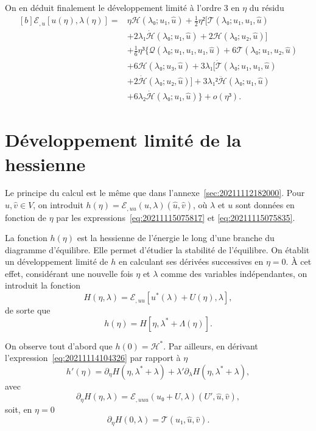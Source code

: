 \documentclass[12pt, final]{amsart}
\begin{document}
On en déduit finalement le développement limité à l'ordre 3 en \(η\) du résidu
\begin{equation}
  \label{eq:20220107080901}
  \begin{aligned}[b]
    ℰ_{,u}[u(η), λ(η)]={}
    &ηℋ(λ₀; u₁, \hat{u})
    +\tfrac12η²\bigl[𝒯(λ₀; u₁, u₁, \hat{u})\\
    &+2λ₁\dot{ℋ}(λ₀; u₁, \hat{u})
    +2ℋ(λ₀; u₂, \hat{u})\bigr]\\
    &+\tfrac16η³\bigl\{
    𝒬(λ₀; u₁, u₁, u₁, \hat{u})
    +6𝒯(λ₀; u₁, u₂, \hat{u})\\
    &+6ℋ(λ₀; u₃, \hat{u})
    +3λ₁\bigl[\dot{𝒯}(λ₀; u₁, u₁, \hat{u})\\
    &+2\dot{ℋ}(λ₀; u₂, \hat{u})\bigr]
    +3λ₁²\ddot{ℋ}(λ₀; u₁, \hat{u})\\
    &+6λ₂\dot{ℋ}(λ₀; u₁, \hat{u})\bigr\}
    +o(η³).
  \end{aligned}
\end{equation}

\section{Développement limité de la hessienne}
\label{sec:20211115081016}

Le principe du calcul est le même que dans
l'annexe~\ref{sec:20211112182000}. Pour \(\hat{u}, \hat{v}∈V\), on introduit
\(h(η)=ℰ_{,uu}(u, λ)(\hat{u}, \hat{v})\), où \(λ\) et \(u\) sont données en
fonction de \(η\) par les expressions~\eqref{eq:20211115075817} et
\eqref{eq:20211115075835}.

La fonction \(h(η)\) est la hessienne de l'énergie le long d'une branche du
diagramme d'équilibre. Elle permet d'étudier la stabilité de l'équilibre. On
établit un développement limité de \(h\) en calculant ses dérivées successives
en \(η=0\). \`A cet effet, considérant une nouvelle fois \(η\) et \(λ\) comme
des variables indépendantes, on introduit la fonction
\begin{equation}
  H(η, λ)=ℰ_{,uu}[u^*(λ)+U(η), λ],
\end{equation}
de sorte que
\begin{equation}
  \label{eq:20211114104326}
  h(η)=H[η, λ^*+Λ(η)].
\end{equation}

On observe tout d'abord que \(h(0)=ℋ^*\). Par ailleurs, en dérivant
l'expression~\eqref{eq:20211114104326} par rapport à \(η\)
\begin{equation}
  \label{eq:20211114110210}
  h'(η)=∂_η H(η, λ^*+λ)+λ'∂_λ H(η, λ^*+λ),
\end{equation}
avec
\begin{equation}
  \label{eq:20211114110852}
  ∂_η H(η, λ)=ℰ_{,uuu}(u₀+U, λ)(U', \hat{u}, \hat{v}),
\end{equation}
soit, en \(η=0\)
\begin{equation}
  \label{eq:20211114110230}
  ∂_η H(0, λ)=𝒯(u₁, \hat{u}, \hat{v}).
\end{equation}
\end{document}
